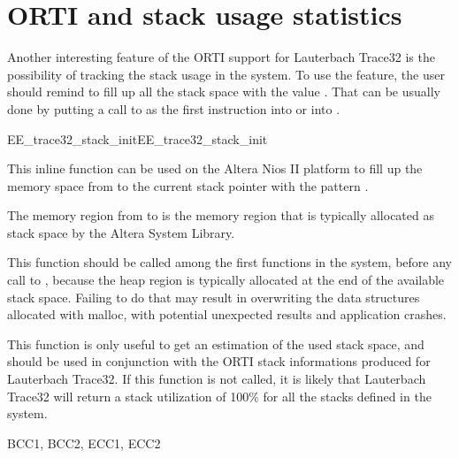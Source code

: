 
\section{ORTI and stack usage statistics}
Another interesting feature of the ORTI support for Lauterbach Trace32
is the possibility of tracking the stack usage in the system. To use
the feature, the user should remind to fill up all the stack space
with the value . That can be usually done by putting
a call to  as the first instruction into
 or into .


\begin{function2}{EE\_trace32\_stack\_init}{EE_trace32_stack_init}
  
  \begin{fundescription}
    This inline function can be used on the Altera Nios II platform to
    fill up the memory space from  to the
    current stack pointer with the pattern .

    The memory region from  to
     is the memory region that is typically
    allocated as stack space by the Altera System Library.

    This function should be called among the first functions in the
    system, before any call to , because the heap region is
    typically allocated at the end of the available stack
    space. Failing to do that may result in overwriting the data
    structures allocated with malloc, with potential unexpected
    results and application crashes.

    This function is only useful to get an estimation of the used
    stack space, and should be used in conjunction with the ORTI stack
    informations produced for Lauterbach Trace32. If this function is
    not called, it is likely that Lauterbach Trace32 will return a
    stack utilization of 100\% for all the stacks defined in the system.
  \end{fundescription}
  
  \begin{funconformance}
    BCC1, BCC2, ECC1, ECC2
  \end{funconformance}
\end{function2}


